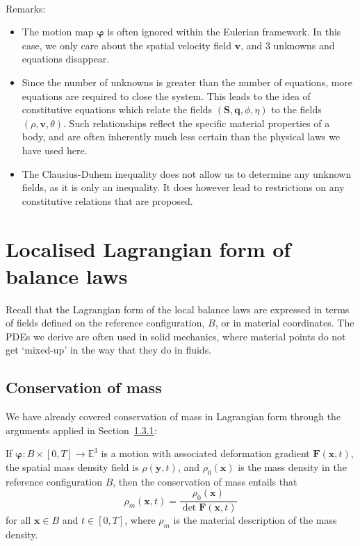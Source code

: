 \documentclass[
  letterpaper,
  DIV=11,
  numbers=noendperiod]{scrreprt}
\makeatletter
\let\oldparagraph\paragraph
\renewcommand{\paragraph}{
    \@ifstar
      \xxxParagraphStar
      \xxxParagraphNoStar
  }
\newcommand{\xxxParagraphStar}[1]{\oldparagraph*{#1}\mbox{}}
\newcommand{\xxxParagraphNoStar}[1]{\oldparagraph{#1}\mbox{}}
\theoremstyle{plain}
\theoremstyle{remark}
\makeatother
\begin{document}
\paragraph{Remarks:}\label{remarks}

\begin{itemize}
\item
  The motion map \({\boldsymbol{\varphi}}\) is often ignored within the
  Eulerian framework. In this case, we only care about the spatial
  velocity field \({\boldsymbol{v}}\), and 3 unknowns and equations
  disappear.
\item
  Since the number of unknowns is greater than the number of equations,
  more equations are required to close the system. This leads to the
  idea of constitutive equations which relate the fields
  \(({\boldsymbol{S}},{\boldsymbol{q}},\phi,\eta)\) to the fields
  \((\rho,{\boldsymbol{v}},\theta)\). Such relationships reflect the
  specific material properties of a body, and are often inherently much
  less certain than the physical laws we have used here.
\item
  The Clausius-Duhem inequality does not allow us to determine any
  unknown fields, as it is only an inequality. It does however lead to
  restrictions on any constitutive relations that are proposed.
\end{itemize}

\section{Localised Lagrangian form of balance
laws}\label{localised-lagrangian-form-of-balance-laws}

Recall that the Lagrangian form of the local balance laws are expressed
in terms of fields defined on the reference configuration, \(B\), or in
material coordinates. The PDEs we derive are often used in solid
mechanics, where material points do not get `mixed-up' in the way that
they do in fluids.

\subsection{Conservation of mass}\label{conservation-of-mass}

We have already covered conservation of mass in Lagrangian form through
the arguments applied in Section~\hyperref[sec:EulerianMass]{1.3.1}:

\label{prop:MassLagrangian}{} If
\({\boldsymbol{\varphi}}:B\times[0,T]\to{\mathbb{E}}^3\) is a motion
with associated deformation gradient
\({\boldsymbol{F}}({\boldsymbol{x}},t)\), the spatial mass density field
is \(\rho({\boldsymbol{y}},t)\), and \(\rho_0({\boldsymbol{x}})\) is the
mass density in the reference configuration \(B\), then the conservation
of mass entails that
\[\rho_m({\boldsymbol{x}},t) = \frac{\rho_0({\boldsymbol{x}})}{\det{\boldsymbol{F}}({\boldsymbol{x}},t)}\]
for all \({\boldsymbol{x}}\in B\) and \(t\in[0,T]\), where \(\rho_m\) is
the material description of the mass density.
\end{document}
